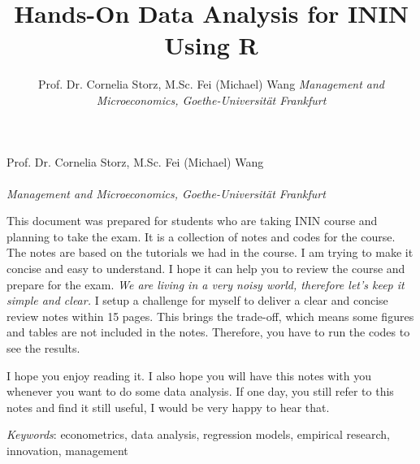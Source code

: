 \documentclass[11pt]{article}
\title{Hands-On Data Analysis for ININ Using R}
\author{\Large Prof. Dr. Cornelia Storz, M.Sc. Fei (Michael) Wang\vspace{0.05in} \newline\normalsize\emph{Management and Microeconomics, Goethe-Universität Frankfurt}  }
\date{}
\newcommand*{\authorfont}{\fontfamily{phv}\selectfont}
\theoremstyle{definition}
\renewenvironment{abstract}
 {{%
    \setlength{\leftmargin}{0mm}
    \setlength{\rightmargin}{\leftmargin}%
  }%
  \relax}
 {\endlist}
\begin{document}
	
%

{%
\setlength{\parindent}{0pt}
\thispagestyle{plain}
{\fontsize{18}{20}\selectfont\raggedright 
\maketitle  %

}

{
   \vskip 13.5pt\relax \normalsize\fontsize{11}{12} 
   \authorfont Prof. Dr. Cornelia Storz, M.Sc. Fei (Michael) Wang \\
   \\ 
    \emph{\small Management and Microeconomics, Goethe-Universität Frankfurt}   
}

}



\begin{abstract}
    \hbox{\vrule height .2pt width 39.14pc}
    \vskip 8.5pt %

\noindent This document was prepared for students who are taking ININ course and
planning to take the exam. It is a collection of notes and codes for the
course. The notes are based on the tutorials we had in the course. I am trying
to make it concise and easy to understand. I hope it can help you to review
the course and prepare for the exam. \textit{We are living in a very noisy world,
therefore let's keep it simple and clear.} I setup a challenge for myself to
deliver a clear and concise review notes within 15 pages. This brings the trade-off,
which means some figures and tables are not included in the notes. Therefore,
you have to run the codes to see the results.  

\vskip 6pt 

\noindent I hope you enjoy reading it. I also hope you will have this notes with you
whenever you want to do some data analysis. If one day, you still refer to this
notes and find it still useful, I would be very happy to hear that.

 

\vskip 8.5pt \noindent \emph{Keywords}: econometrics, data analysis, regression models, 
empirical research, innovation, management  \par
\hbox{\vrule height .2pt width 39.14pc}

\end{abstract}
\end{document}
